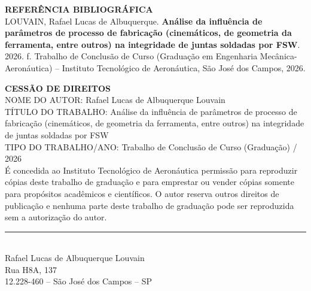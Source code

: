 \documentclass[12pt,openany]{report}
\begin{document}
\vspace{1cm}
\begin{singlespace}\small
\noindent\textbf{REFERÊNCIA BIBLIOGRÁFICA}\\[4pt]
LOUVAIN, Rafael Lucas de Albuquerque. \textbf{Análise da influência de parâmetros de processo de fabricação (cinemáticos, de geometria da ferramenta, entre outros) na integridade de juntas soldadas por FSW}. 2026. \pageref{LastPage}f. Trabalho de Conclusão de Curso (Graduação em Engenharia Mecânica-Aeronáutica) -- Instituto Tecnológico de Aeronáutica, São José dos Campos, 2026.

\vspace{0.8cm}
\noindent\textbf{CESSÃO DE DIREITOS}\\[4pt]
{\footnotesize NOME DO AUTOR:} Rafael Lucas de Albuquerque Louvain\\
{\footnotesize TÍTULO DO TRABALHO:} Análise da influência de parâmetros de processo de fabricação (cinemáticos, de geometria da ferramenta, entre outros) na integridade de juntas soldadas por FSW\\
{\footnotesize TIPO DO TRABALHO/ANO:} Trabalho de Conclusão de Curso (Graduação) / 2026\\[6pt]
É concedida ao Instituto Tecnológico de Aeronáutica permissão para reproduzir cópias deste trabalho de graduação e para emprestar ou vender cópias somente para propósitos acadêmicos e científicos. O autor reserva outros direitos de publicação e nenhuma parte deste trabalho de graduação pode ser reproduzida sem a autorização do autor.

\vspace{1.5cm}
\noindent\rule{7cm}{0.4pt}\\
Rafael Lucas de Albuquerque Louvain\\
Rua H8A, 137\\
12.228-460 -- São José dos Campos -- SP
\end{singlespace}
\newpage
\end{document}
